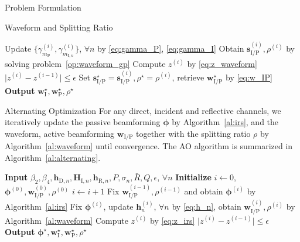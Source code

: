 \documentclass[journal]{IEEEtran}
\begin{document}
\begin{section}{Problem Formulation}
\begin{subsection}{Waveform and Splitting Ratio}
\begin{algorithm}[!t]
\begin{algorithmic}[1]
						\State Update $\{\gamma_{m_\mathrm{P}}^{(i)},\gamma_{m_{\mathrm{I},n}}^{(i)}\}$, $\forall n$ by \eqref{eq:gamma_P}, \eqref{eq:gamma_I}
						\State Obtain $\boldsymbol{s}_{\mathrm{I/P}}^{(i)},\rho^{(i)}$ by solving problem~\eqref{op:waveform_gp}
						\State Compute $z^{(i)}$ by \eqref{eq:z_waveform}
					\Until $\lvert z^{(i)} - z^{(i-1)} \rvert \le \epsilon$
					\State Set $\boldsymbol{s}_{\mathrm{I/P}}^{\star}=\boldsymbol{s}_{\mathrm{I/P}}^{(i)},\rho^{\star}=\rho^{(i)}$, retrieve $\boldsymbol{w}_{\mathrm{I/P}}^{\star}$ by \eqref{eq:w_IP}
					\State \textbf{Output} $\boldsymbol{w}_{\mathrm{I}}^{\star},\boldsymbol{w}_{\mathrm{P}}^{\star},\rho^{\star}$
				\end{algorithmic}
			\end{algorithm}
		\end{subsection}


		\begin{subsection}{Alternating Optimization}
			For any direct, incident and reflective channels, we iteratively update the passive beamforming $\boldsymbol{\phi}$ by Algorithm~\ref{al:irs}, and the waveform, active beamforming $\boldsymbol{w}_{\mathrm{I/P}}$ together with the splitting ratio $\rho$ by Algorithm~\ref{al:waveform} until convergence. The AO algorithm is summarized in Algorithm~\ref{al:alternating}.
			\begin{algorithm}[!t]
				\caption{AO: Waveform, Active and Passive Beamforming, and Splitting Ratio.}
				\label{al:alternating}
				\begin{algorithmic}[1]
					\State \textbf{Input} $\beta_2,\beta_4,\boldsymbol{h}_{\mathrm{D},n},\boldsymbol{H}_{\mathrm{I},n},\boldsymbol{h}_{\mathrm{R},n},P,\sigma_n,\bar{R},Q,\epsilon$, $\forall n$
					\State \textbf{Initialize} $i \gets 0$, $\boldsymbol{\phi}^{(0)},\boldsymbol{w}_{\mathrm{I/P}}^{(0)},\rho^{(0)}$
					\Repeat
						\State $i \gets i + 1$
						\State Fix $\boldsymbol{w}_{\mathrm{I/P}}^{(i-1)},\rho^{(i-1)}$ and obtain $\boldsymbol{\phi}^{(i)}$ by Algorithm~\ref{al:irs}
						\State Fix $\boldsymbol{\phi}^{(i)}$, update $\boldsymbol{h}_n^{(i)}$, $\forall n$ by \eqref{eq:h_n}, obtain $\boldsymbol{w}_{\mathrm{I/P}}^{(i)}, \rho^{(i)}$ by Algorithm~\ref{al:waveform}
						\State Compute $z^{(i)}$ by \eqref{eq:z_irs}
					\Until $\lvert z^{(i)} - z^{(i-1)} \rvert \le \epsilon$
					\State \textbf{Output} $\boldsymbol{\phi}^{\star},\boldsymbol{w}_{\mathrm{I}}^{\star},\boldsymbol{w}_{\mathrm{P}}^{\star},\rho^{\star}$
				\end{algorithmic}
			\end{algorithm}
		\end{subsection}



\end{section}
\end{document}
